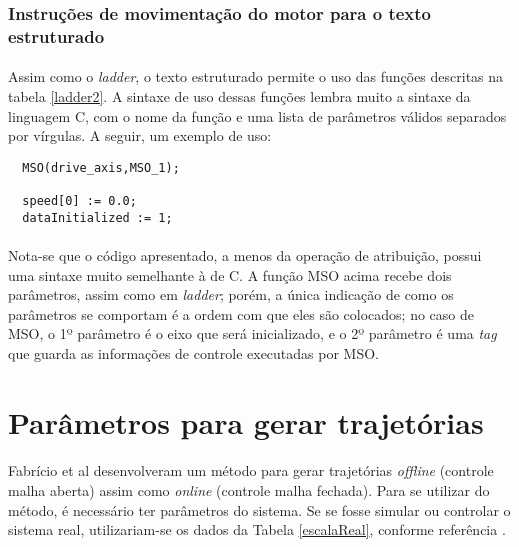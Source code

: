 \subsubsection{Instruções de movimentação do motor para o texto estruturado}
\paragraph{}Assim como o \textit{ladder}, o texto estruturado permite o uso das funções descritas na tabela \ref{ladder2}. A sintaxe de uso dessas funções lembra muito a sintaxe da linguagem C, com o nome da função e uma lista de parâmetros válidos separados por vírgulas. A seguir, um exemplo de uso:
 
\begin{lstlisting}
  MSO(drive_axis,MSO_1);

  speed[0] := 0.0;
  dataInitialized := 1;
\end{lstlisting}

\paragraph{}Nota-se que o código apresentado, a menos da operação de atribuição, possui uma sintaxe muito semelhante à de C. A função MSO acima recebe dois parâmetros, assim como em \textit{ladder}; porém, a única indicação de como os parâmetros se comportam é a ordem com que eles são colocados; no caso de MSO, o 1º parâmetro é o eixo que será inicializado, e o 2º parâmetro é uma \textit{tag} que guarda as informações de controle executadas por MSO.


\section{Parâmetros para gerar trajetórias}

\paragraph{}Fabrício et al \cite{fabricioIFAC} desenvolveram um método para gerar trajetórias \textit{offline} (controle malha aberta) assim como \textit{online} (controle malha fechada). Para se utilizar do método, é necessário ter parâmetros do sistema. Se se fosse simular ou controlar o sistema real, utilizariam-se os dados da Tabela \ref{escalaReal}, conforme referência \cite{redytton}.

